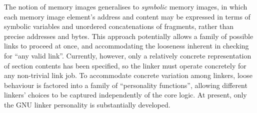 The notion of memory images generalises to \emph{symbolic} memory images, in which 
each memory image element's address and content may be expressed in terms of 
symbolic variables and unordered concatenations of fragments, rather than precise addresses
and bytes.
This approach potentially allows a family of possible links to proceed at once,
and accommodating the looseness inherent in checking for ``any valid link''.
Currently, however, only a relatively concrete representation of section contents has been specified, 
so the linker must operate concretely for any non-trivial link job.
To accommodate concrete variation among linkers, loose behaviour is factored into 
a family of ``personality functions'', allowing different linkers' choices to be 
captured independently of the core logic. 
At present, only the GNU linker personality is substantially developed.


% 
% 
% 

% 
% 
% 
% 
% 
% 
% 
% 




